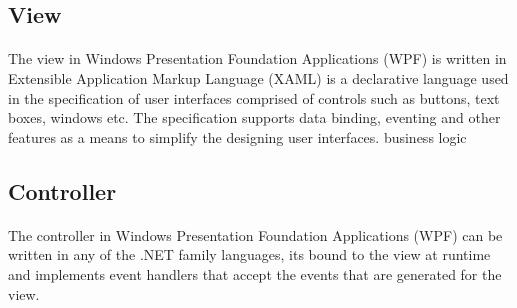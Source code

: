 		\subsection{View}
		\vspace{5mm}
		\begin{multicols}{2}
		\paragraph{}
		
		The view in Windows Presentation Foundation Applications (WPF) is written in Extensible Application Markup Language (XAML) is a declarative language 
		used in the specification of user interfaces comprised of controls such as buttons, text boxes, windows etc.  The specification supports data binding, 
		eventing and other features as a means to simplify the designing user interfaces. 
		business logic

		\end{multicols}
		
		\subsection{Controller}
		\vspace{5mm}
		\begin{multicols}{2}
		\paragraph{}
		
		The controller in Windows Presentation Foundation Applications (WPF) can be written in any of the .NET family languages, its bound to the view at runtime 
		and implements event handlers that accept the events that are generated for the view.  

		\end{multicols}